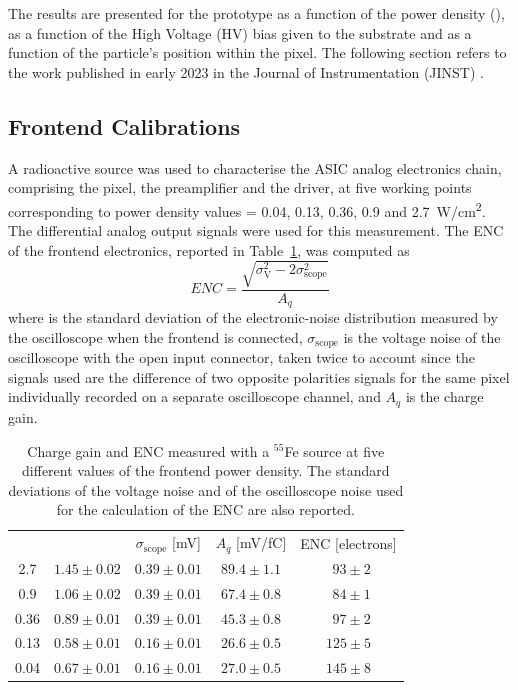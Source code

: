 	The results are presented for the prototype as a function of the power density (\power), as a function of the High Voltage (HV) bias given to the substrate and as a function of the particle's position within the pixel. The following section refers to the work published in early 2023 in the Journal of Instrumentation (JINST) \cite{MONOLITH_proto2_20ps}.
		
		\subsection{Frontend Calibrations}
		A radioactive \Fe source was used to characterise the ASIC analog electronics chain, comprising the pixel, the preamplifier and the driver, at five working points corresponding to power density values \power = 0.04, 0.13, 0.36, 0.9 and \SI{2.7}{\watt/\centi\meter^2}. The differential analog output signals were used for this measurement.
		The ENC of the frontend electronics, reported in Table~\ref{tab:MONO_gain}, was computed as 
		\begin{equation}
			ENC = \frac{\sqrt{\sigma_{\text{V}}^2 -2\sigma_{\text{scope}}^2}}{A_q}
		\end{equation}
		where \noise is the standard deviation of the electronic-noise distribution measured by the oscilloscope when the frontend is connected, $\sigma_{\text{scope}}$ is the voltage noise of the oscilloscope with the open input connector, taken twice to account since the signals used are the difference of two opposite polarities signals for the same pixel individually recorded on a separate oscilloscope channel, and $A_q$ is the charge gain.
		
		\begin{table}[h]
			\centering
			\renewcommand{\arraystretch}{1.3}
			\begin{tabular}{|c|c|c|c|c|}
			\cline{1-5}
			\cline{1-5}
			\ \power [W/cm$^2$] &  \noise [mV] & $\sigma_{\text{scope}}$ [mV] & $A_q$ [mV/fC] & ENC [electrons] \\
			\cline{1-5}
			2.7   & $ 1.45 \pm 0.02 $ & $ 0.39\pm0.01 $ & $89.4 \pm 1.1 $ & $~~93\pm2$ \\
			0.9   & $ 1.06 \pm 0.02 $ & $ 0.39\pm0.01 $ & $67.4 \pm 0.8 $ & $~~84\pm1$ \\
			0.36  & $ 0.89 \pm 0.01 $ & $ 0.39\pm0.01 $ & $45.3 \pm 0.8 $ & $~~97\pm2$ \\
			0.13  & $ 0.58 \pm 0.01 $ & $ 0.16\pm0.01 $ & $26.6 \pm 0.5 $ & $ 125\pm5$ \\
			0.04  & $ 0.67 \pm 0.01 $ & $ 0.16\pm0.01 $ & $27.0 \pm 0.5 $ & $ 145\pm8$ \\
			\cline{1-5}
			\end{tabular}
			\caption{Charge gain and ENC measured with a $^{55}$Fe source at five different values of the frontend power density. The standard deviations  of the voltage noise and of the oscilloscope noise used for the calculation of the ENC are also reported.}
			\label{tab:MONO_gain} 
		\end{table}

